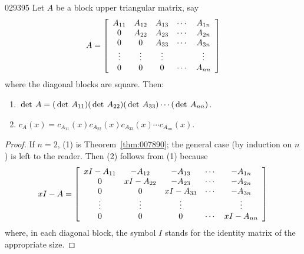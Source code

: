 \begin{theorem}{}{029395}
Let $A$ be a block upper triangular matrix, say
\begin{equation*}
A = \left[ \begin{array}{ccccc}
A_{11} & A_{12} & A_{13} & \cdots & A_{1n} \\
0 & A_{22} & A_{23} & \cdots & A_{2n} \\
0 & 0 & A_{33} & \cdots & A_{3n} \\
\vdots & \vdots & \vdots & & \vdots \\
0 & 0 & 0 & \cdots & A_{nn} \\
\end{array} \right]
\end{equation*}
where the diagonal blocks are square. Then:


\begin{enumerate}
\item $\thinspace\operatorname{det \medspace}A = (\thinspace\operatorname{det \medspace}A_{11})(\thinspace\operatorname{det \medspace}A_{22})(\thinspace\operatorname{det \medspace}A_{33})\cdots(\thinspace\operatorname{det \medspace}A_{nn})$.

\item $c_A(x) = c_{A_{11}}(x)c_{A_{22}}(x)c_{A_{33}}(x){\cdots}c_{A_{nn}}(x)$.

\end{enumerate}
\end{theorem}

\begin{proof}
If $n = 2$, (1) is Theorem~\ref{thm:007890}; the general case (by induction on $n$) is left to the reader. Then (2) follows from (1) because
\begin{equation*}
xI - A = \left[ \begin{array}{ccccc}
xI - A_{11} & -A_{12} & -A_{13} & \cdots & -A_{1n} \\
0 & xI - A_{22} & -A_{23} & \cdots & -A_{2n} \\
0 & 0 & xI - A_{33} & \cdots & -A_{3n} \\
\vdots & \vdots & \vdots & & \vdots \\
0 & 0 & 0 & \cdots & xI - A_{nn} \\
\end{array} \right]
\end{equation*}
where, in each diagonal block, the symbol $I$ stands for the identity matrix of the appropriate size.
\end{proof}


